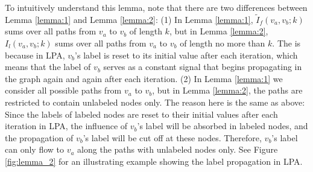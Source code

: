 \documentclass{article}
\begin{document}
		To intuitively understand this lemma, note that there are two differences between Lemma \ref{lemma:1} and Lemma \ref{lemma:2}:
		(1) In Lemma \ref{lemma:1}, $\tilde I_f(v_a, v_b; k)$ sums over all paths from $v_a$ to $v_b$ of length $k$, but in Lemma \ref{lemma:2}, $I_l(v_a, v_b; k)$ sums over all paths from $v_a$ to $v_b$ of length no more than $k$.
		The is because in LPA, $v_b$'s label is reset to its initial value after each iteration, which means that the label of $v_b$ serves as a constant signal that begins propagating in the graph again and again after each iteration.
		(2) In Lemma \ref{lemma:1} we consider all possible paths from $v_a$ to $v_b$, but in Lemma \ref{lemma:2}, the paths are restricted to contain unlabeled nodes only.
		The reason here is the same as above:
		Since the labels of labeled nodes are reset to their initial values after each iteration in LPA, the influence of $v_b$'s label will be absorbed in labeled nodes, and the propagation of $v_b$'s label will be cut off at these nodes.
		Therefore, $v_b$'s label can only flow to $v_a$ along the paths with unlabeled nodes only.
		See Figure \ref{fig:lemma_2} for an illustrating example showing the label propagation in LPA.
		
\end{document}
